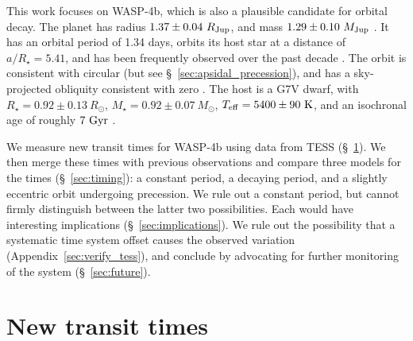 \documentclass[12pt,twocolumn,tighten]{aastex62}
\begin{document}
This work focuses on WASP-4b, which is also a plausible candidate for
orbital decay.  The planet has radius $1.37 \pm 0.04\ R_{\rm Jup}$,
and mass $1.29 \pm 0.10\ M_{\rm Jup}$
\citep{southworth_homogeneous_2011}.  It has an orbital period of 1.34
days, orbits its host star at a distance of $a/R_\star = 5.41$, and
has been frequently observed over the past decade
\citep{wilson_wasp-4b_2008,huitson_gemini_2017}.  The orbit is
consistent with circular (but see \S~\ref{sec:apsidal_precession}),
and has a sky-projected obliquity consistent with zero
\citep{triaud_spin-orbit_2010,beerer_secondary_2011,sanchis-ojeda_starspots_2011}.
The host is a G7V dwarf, with $R_\star = 0.92 \pm 0.13\ R_\odot$,
$M_\star = 0.92 \pm 0.07\ M_\odot$, $T_{\rm eff} = 5400 \pm 90\ {\rm
K}$, and an isochronal age of roughly $7\ {\rm Gyr}$
\citep{southworth_homogeneous_2011,petrucci_no_2013,doyle_accurate_2013}.

We measure new transit times for WASP-4b using data from TESS
(\S~\ref{sec:transits}).  We then merge these times with previous
observations and compare three models for the times
(\S~\ref{sec:timing}): a constant period, a decaying period, and a
slightly eccentric orbit undergoing precession.  We rule out a
constant period, but cannot firmly distinguish between the latter two
possibilities.  Each would have interesting implications
(\S~\ref{sec:implications}).  We rule out the possibility that a
systematic time system offset causes the observed variation
(Appendix~\ref{sec:verify_tess}), and conclude by advocating for
further monitoring of the system (\S~\ref{sec:future}).



\section{New transit times}
\label{sec:transits}
\end{document}
